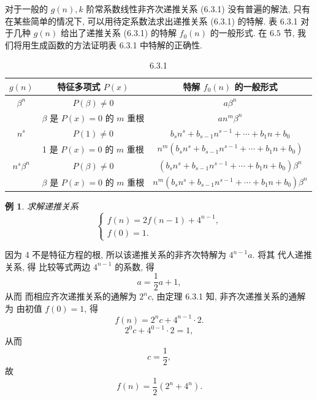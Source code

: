 \documentclass[punct]{ctexbeamer}
\newtheorem{ex}{例}[section]
\def\sol{\noindent {\bf 解\ }}
\begin{document}
\begin{frame}
	对于一般的 $g(n), k$ 阶常系数线性非齐次递推关系 (6.3.1) 没有普遍的解法, 只有在某些简单的情况下, 可以用待定系数法求出递推关系 (6.3.1) 的特解. 表 6.3.1 对于几种 $g(n)$ 给出了递推关系 (6.3.1) 的特解 $f_0(n)$ 的一般形式. 在 $6.5$ 节, 我们将用生成函数的方法证明表 6.3.1 中特解的正确性.
\begin{table}[h]

		\caption{6.3.1}
			\vspace{-2.0em}
	\begin{tabular}{c||c|c}
		\hline$g(n)$ & 特征多项式 $P(x)$ & 特解 $f_0(n)$ 的一般形式 \\
		\hline \hline $\beta^n$ & $P(\beta) \neq 0$ & $a \beta^n$ \\
		\cline { 2 - 3 } & $\beta$ 是 $P(x)=0$ 的 $m$ 重根 & $a n^m \beta^n$ \\
		\hline {$n^s$} & $P(1) \neq 0$ & $b_s n^s+b_{s-1} n^{s-1}+\cdots+b_1 n+b_0$ \\
		\cline { 2 - 3 } & 1 是 $P(x)=0$ 的 $m$ 重根 & $n^m\left(b_s n^s+b_{s-1} n^{s-1}+\cdots+b_1 n+b_0\right)$ \\
		\hline {$n^s \beta^n$} & $P(\beta) \neq 0$ & $\left(b_s n^s+b_{s-1} n^{s-1}+\cdots+b_1 n+b_0\right) \beta^n$ \\
		\cline { 2 - 3 } & $\beta$ 是 $P(x)=0$ 的 $m$ 重根 & $n^m\left(b_s n^s+b_{s-1} n^{s-1}+\cdots+b_1 n+b_0\right) \beta^n$ \\
		\hline
	\end{tabular}
\end{table}
\end{frame}

\begin{frame}
	\begin{ex}
		求解递推关系
		$$
		\left\{\begin{array}{l}
			f(n)=2 f(n-1)+4^{n-1}, \\
			f(0)=1 .
		\end{array}\right.
		$$
	\end{ex}
\pause\sol
因为 4 不是特征方程的根, 所以该递推关系的非齐次特解为 $4^{n-1} a$. 将其 代人递推关系, 得
比较等式两边 $4^{n-1}$ 的系数, 得
$$
a=\frac{1}{2} a+1,
$$
从而
而相应齐次递推关系的通解为 $2^n c$, 由定理 6.3.1 知, 非齐次递推关系的通解为 由初值 $f(0)=1$, 得
$$
f(n)=2^n c+4^{n-1} \cdot 2 .
$$
$$
2^0 c+4^{0-1} \cdot 2=1,
$$
从而
$$
c=\frac{1}{2},
$$
故
$$
f(n)=\frac{1}{2}\left(2^n+4^n\right) .
$$
\end{frame}
\end{document}
